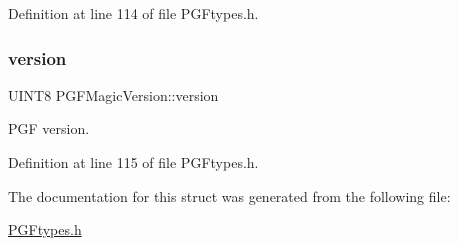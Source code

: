 Definition at line 114 of file P\+G\+Ftypes.\+h.

\mbox{\label{structPGFMagicVersion_aa7ff5e50537cac9dd4c62d4c8982d09d}} 
\subsubsection{\texorpdfstring{version}{version}}
{\footnotesize\ttfamily U\+I\+N\+T8 P\+G\+F\+Magic\+Version\+::version\hspace{0.3cm}{\ttfamily [inherited]}}



P\+GF version. 



Definition at line 115 of file P\+G\+Ftypes.\+h.



The documentation for this struct was generated from the following file\+:\begin{DoxyCompactItemize}
\item 
\mbox{\hyperlink{PGFtypes_8h}{P\+G\+Ftypes.\+h}}\end{DoxyCompactItemize}

